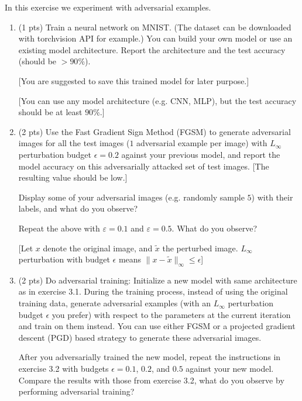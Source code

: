 \documentclass[10pt,letter,notitlepage]{article}
\newcounter{exercise}
\begin{document}
\begin{exercise}
	In this exercise we experiment with adversarial examples.

	\begin{enumerate}

		\item (1 pts) Train a neural network on MNIST. (The dataset can be downloaded with torchvision API for example.) You can build your own model or use an existing model architecture. Report the architecture and the test accuracy (should be $>90\%$).

		[You are suggested to save this trained model for later purpose.]

		[You can use any model architecture (e.g. CNN, MLP), but the test accuracy should be at least $90\%$.]


  \item (2 pts) Use the Fast Gradient Sign Method (FGSM) to generate adversarial images for all the test images ($1$ adversarial example per image) with $L_{\infty}$ perturbation budget $\epsilon = 0.2$ against your previous model, and report the model accuracy on this adversarially attacked set of test images. [The resulting value should be low.]

		Display some of your adversarial images (e.g. randomly sample $5$) with their labels, and what do you observe?

    Repeat the above with $\varepsilon = 0.1$ and $\varepsilon = 0.5$. What do you observe?


		[Let $x$ denote the original image, and $\tilde{x}$ the perturbed image. $L_{\infty}$ perturbation with budget $\epsilon$ means $\|x-\tilde{x}\|_{\infty} \leq \epsilon$]


		\item (2 pts) Do adversarial training: Initialize a new model with same architecture as in exercise 3.1. During the training process, instead of using the original training data, generate adversarial examples (with an $L_{\infty}$ perturbation budget $\epsilon$ you prefer) with respect to the parameters at the current iteration and train on them instead.
      You can use either FGSM or a projected gradient descent (PGD) based strategy to generate these adversarial images.

		After you adversarially trained the new model, repeat the instructions in exercise 3.2 with budgets $\epsilon=0.1$, $0.2$, and $0.5$ against your new model. 
      Compare the results with those from exercise 3.2, what do you observe by performing adversarial training?


\end{enumerate}
\end{exercise}
\end{document}
